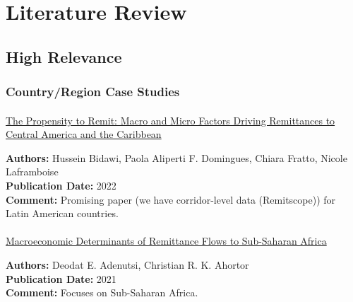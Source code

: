 \documentclass[
  11pt,
]{article}
\makeatletter
\let\oldparagraph\paragraph
\renewcommand{\paragraph}{
    \@ifstar
      \xxxParagraphStar
      \xxxParagraphNoStar
  }
\newcommand{\xxxParagraphStar}[1]{\oldparagraph*{#1}\mbox{}}
\newcommand{\xxxParagraphNoStar}[1]{\oldparagraph{#1}\mbox{}}
\makeatother
\begin{document}
\section{Literature Review}\label{literature-review}

\subsection{High Relevance}\label{high-relevance}

\subsubsection{Country/Region Case
Studies}\label{countryregion-case-studies}

\paragraph{\texorpdfstring{\href{https://www.elibrary.imf.org/view/journals/001/2022/203/article-A001-en.xml}{The
Propensity to Remit: Macro and Micro Factors Driving Remittances to
Central America and the
Caribbean}}{The Propensity to Remit: Macro and Micro Factors Driving Remittances to Central America and the Caribbean}}\label{the-propensity-to-remit-macro-and-micro-factors-driving-remittances-to-central-america-and-the-caribbean}

\textbf{Authors:} Hussein Bidawi, Paola Aliperti F. Domingues, Chiara
Fratto, Nicole Laframboise\\
\textbf{Publication Date:} 2022\\
\textbf{Comment:} Promising paper (we have corridor-level data
(Remitscope)) for Latin American countries.

\paragraph{\texorpdfstring{\href{https://www.aercafrica.org/publications/research-papers/macroeconomic-determinants-of-remittance-flows-to-sub-saharan-africa/}{Macroeconomic
Determinants of Remittance Flows to Sub-Saharan
Africa}}{Macroeconomic Determinants of Remittance Flows to Sub-Saharan Africa}}\label{macroeconomic-determinants-of-remittance-flows-to-sub-saharan-africa}

\textbf{Authors:} Deodat E. Adenutsi, Christian R. K. Ahortor\\
\textbf{Publication Date:} 2021\\
\textbf{Comment:} Focuses on Sub-Saharan Africa.
\end{document}
